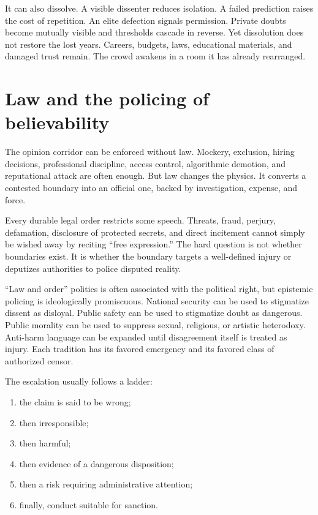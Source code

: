 ﻿\documentclass[12pt,a4paper]{book}
\begin{document}
It can also dissolve. A visible dissenter reduces isolation. A failed prediction raises the cost of repetition. An elite defection signals permission. Private doubts become mutually visible and thresholds cascade in reverse. Yet dissolution does not restore the lost years. Careers, budgets, laws, educational materials, and damaged trust remain. The crowd awakens in a room it has already rearranged.

\section{Law and the policing of believability}

The opinion corridor can be enforced without law. Mockery, exclusion, hiring decisions, professional discipline, access control, algorithmic demotion, and reputational attack are often enough. But law changes the physics. It converts a contested boundary into an official one, backed by investigation, expense, and force.

Every durable legal order restricts some speech. Threats, fraud, perjury, defamation, disclosure of protected secrets, and direct incitement cannot simply be wished away by reciting “free expression.” The hard question is not whether boundaries exist. It is whether the boundary targets a well-defined injury or deputizes authorities to police disputed reality.

“Law and order” politics is often associated with the political right, but epistemic policing is ideologically promiscuous. National security can be used to stigmatize dissent as disloyal. Public safety can be used to stigmatize doubt as dangerous. Public morality can be used to suppress sexual, religious, or artistic heterodoxy. Anti-harm language can be expanded until disagreement itself is treated as injury. Each tradition has its favored emergency and its favored class of authorized censor.

The escalation usually follows a ladder:

\begin{enumerate}
  \item the claim is said to be wrong;
  \item then irresponsible;
  \item then harmful;
  \item then evidence of a dangerous disposition;
  \item then a risk requiring administrative attention;
  \item finally, conduct suitable for sanction.
\end{enumerate}
\end{document}
